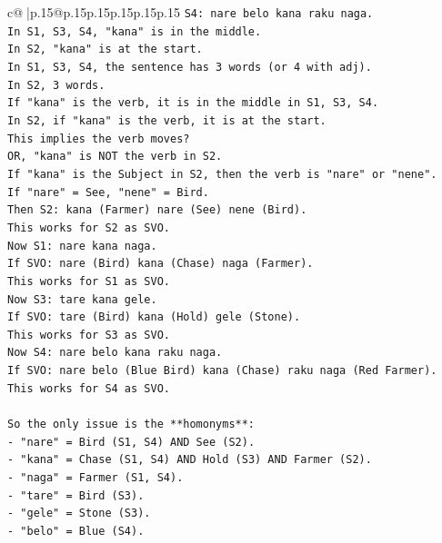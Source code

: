 \documentclass{article}
\begin{document}
{\begin{supertabular}{c@{$\;$}|p{.15\linewidth}@{}p{.15\linewidth}p{.15\linewidth}p{.15\linewidth}p{.15\linewidth}p{.15\linewidth}}
{{{\texttt{S4: nare belo kana raku naga.} \\
\texttt{In S1, S3, S4, "kana" is in the middle.} \\
\texttt{In S2, "kana" is at the start.} \\
\texttt{In S1, S3, S4, the sentence has 3 words (or 4 with adj).} \\
\texttt{In S2, 3 words.} \\
\texttt{If "kana" is the verb, it is in the middle in S1, S3, S4.} \\
\texttt{In S2, if "kana" is the verb, it is at the start.} \\
\texttt{This implies the verb moves?} \\
\texttt{OR, "kana" is NOT the verb in S2.} \\
\texttt{If "kana" is the Subject in S2, then the verb is "nare" or "nene".} \\
\texttt{If "nare" = See, "nene" = Bird.} \\
\texttt{Then S2: kana (Farmer) nare (See) nene (Bird).} \\
\texttt{This works for S2 as SVO.} \\
\texttt{Now S1: nare kana naga.} \\
\texttt{If SVO: nare (Bird) kana (Chase) naga (Farmer).} \\
\texttt{This works for S1 as SVO.} \\
\texttt{Now S3: tare kana gele.} \\
\texttt{If SVO: tare (Bird) kana (Hold) gele (Stone).} \\
\texttt{This works for S3 as SVO.} \\
\texttt{Now S4: nare belo kana raku naga.} \\
\texttt{If SVO: nare belo (Blue Bird) kana (Chase) raku naga (Red Farmer).} \\
\texttt{This works for S4 as SVO.} \\
\\ 
\texttt{So the only issue is the **homonyms**:} \\
\texttt{{-} "nare" = Bird (S1, S4) AND See (S2).} \\
\texttt{{-} "kana" = Chase (S1, S4) AND Hold (S3) AND Farmer (S2).} \\
\texttt{{-} "naga" = Farmer (S1, S4).} \\
\texttt{{-} "tare" = Bird (S3).} \\
\texttt{{-} "gele" = Stone (S3).} \\
\texttt{{-} "belo" = Blue (S4).} \\
}}}
\end{supertabular}}
\end{document}
